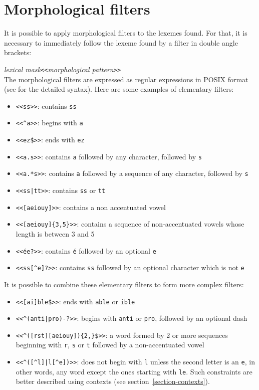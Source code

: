 \section{Morphological filters}
\label{section-filters}

It is possible to apply morphological filters to the lexemes found. For that, it is necessary to
immediately follow the lexeme found by a filter in double angle brackets:

\bigskip
\noindent
\textit{lexical mask}\verb$<<$\textit{morphological pattern}\verb$>>$ \\


\bigskip{}
\noindent The morphological filters are expressed as regular expressions in POSIX
format (see \cite{TRE} for the detailed syntax). Here are some examples of
elementary filters:



\begin{itemize}
  \item \verb$<<ss>>$: contains \verb$ss$
  \item \verb$<<^a>>$: begins with \verb$a$
  \item \verb+<<ez$>>+: ends with \verb$ez$
  \item \verb$<<a.s>>$: contains \verb$a$ followed by any character, followed by \verb$s$
  \item \verb$<<a.*s>>$: contains \verb$a$ followed by a sequence of any character, followed by \verb$s$
  \item \verb$<<ss|tt>>$: contains \verb$ss$ or \verb$tt$
  \item \verb$<<[aeiouy]>>$: contains a non accentuated vowel
  \item \verb$<<[aeiouy]{3,5}>>$: contains a sequence of non-accentuated vowels whose length 
        is between 3 and 5
  \item \texttt{<<\'ee?>>}: contains \texttt{\'e} followed by an
  optional \verb$e$
  \item \verb$<<ss[^e]?>>$: contains \verb$ss$ followed by an optional character which is not \verb$e$
\end{itemize}

\bigskip
\noindent It is possible to combine these elementary filters to form more complex filters:

\begin{itemize}
  \item \verb+<<[ai]ble$>>+: ends with \verb$able$ or \verb$ible$
  \item \verb$<<^(anti|pro)-?>>$: begins with \verb$anti$ or \verb$pro$, followed by an optional dash
  \item \verb+<<^([rst][aeiouy]){2,}$>>+: a word formed by 2 or more sequences beginning 
        with \verb$r$, \verb$s$
  or \verb$t$ followed by a non-accentuated vowel
  \item \verb!<<^([^l]|l[^e])>>!: does not begin with \verb$l$ unless the second letter is an
  \verb$e$, in other words, any word except the ones starting with \verb$le$. Such constraints
  are better described using contexts (see section~\ref{section-contexts}).
\end{itemize}

